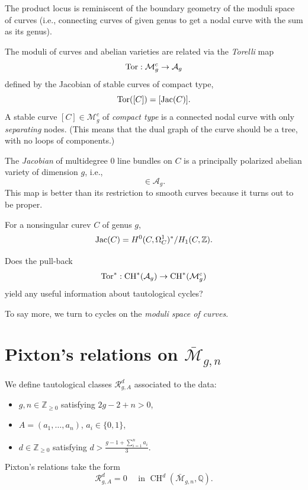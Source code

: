\documentclass[reqno]{amsart} 
\begin{document}
The product locus is reminiscent of the boundary geometry of the moduli space of curves (i.e., connecting curves of given genus to get a nodal curve with the sum as its genus).

The moduli of curves and abelian varieties are related via the \emph{Torelli} map
\begin{equation*}
  \operatorname{Tor} : \mathcal{M}_g^c \rightarrow \mathcal{A}_g
\end{equation*}
defined by the Jacobian of stable curves of compact type,
\begin{equation*}
  \operatorname{Tor}([C]) =[\operatorname{Jac}(C)].
\end{equation*}
A stable curve $[C] \in \mathcal{M}_g^c$ of \emph{compact type} is a connected nodal curve with only \emph{separating} nodes.  (This means that the dual graph of the curve should be a tree, with no loops of components.)

The \emph{Jacobian} of multidegree $0$ line bundles on $C$ is a principally polarized abelian variety of dimension $g$, i.e.,
\begin{equation*}
  [\Jac(C)] \in \mathcal{A}_g.
\end{equation*}
This map is better than its restriction to smooth curves because it turns out to be proper.

For a nonsingular curev $C$ of genus $g$,
\begin{equation*}
  \operatorname{Jac}(C) = H^0(C, \Omega_C^1)^\ast / H_1(C, \mathbb{Z}).
\end{equation*}
\begin{question}
  Does the pull-back
  \begin{equation*}
    \operatorname{Tor}^\ast : \operatorname{CH}^\ast(\mathcal{A}_g) \rightarrow \operatorname{CH}^\ast(\mathcal{M}_g^{c})
  \end{equation*}
  yield any useful information about tautological cycles?
\end{question}
To say more, we turn to cycles on the \emph{moduli space of curves}.

\section{Pixton's relations on $\bar{\mathcal{M}}_{g, n}$}

We define tautological classes $\mathcal{R}_{g, A}^{d}$ associated to the data:
\begin{itemize}
\item $g, n \in \mathbb{Z}_{\geq 0}$ satisfying $2 g - 2 + n > 0$,
\item $A =(a_1, \dotsc, a_n)$, $a_i \in \{0, 1\}$,
\item $d \in \mathbb{Z}_{\geq 0}$ satisfying $d > \frac{g - 1 + \sum_{i = 1}^n a_i}{3}$.
\end{itemize}
Pixton's relations take the form
\begin{equation*}
  \mathcal{R}_{g, A}^{d} = 0 \quad \text{ in } \operatorname{CH}^{d}(\bar{\mathcal{M}}_{g, n}, \mathbb{Q}).
\end{equation*}
\end{document}
